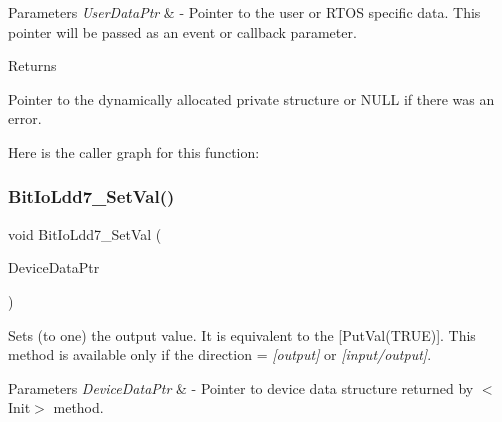 \begin{DoxyParams}{Parameters}
{\em User\+Data\+Ptr} & -\/ Pointer to the user or R\+T\+OS specific data. This pointer will be passed as an event or callback parameter. \\
\hline
\end{DoxyParams}
\begin{DoxyReturn}{Returns}

\begin{DoxyItemize}
\item Pointer to the dynamically allocated private structure or N\+U\+LL if there was an error. 
\end{DoxyItemize}
\end{DoxyReturn}
Here is the caller graph for this function\+:
\mbox{\label{group___bit_io_ldd7__module_gaae11392cdaf0061ec255e1de58e509f5}} 
\subsubsection{\texorpdfstring{Bit\+Io\+Ldd7\+\_\+\+Set\+Val()}{BitIoLdd7\_SetVal()}}
{\footnotesize\ttfamily void Bit\+Io\+Ldd7\+\_\+\+Set\+Val (\begin{DoxyParamCaption}\item[{\hyperlink{group___p_e___types__module_gac5cf1362f1f0e3a2ce71b1bf2276d091}{L\+D\+D\+\_\+\+T\+Device\+Data} $\ast$}]{Device\+Data\+Ptr }\end{DoxyParamCaption})}



Sets (to one) the output value. It is equivalent to the \mbox{[}Put\+Val(\+T\+R\+U\+E)\mbox{]}. This method is available only if the direction = {\itshape \mbox{[}output\mbox{]}} or {\itshape \mbox{[}input/output\mbox{]}}. 


\begin{DoxyParams}{Parameters}
{\em Device\+Data\+Ptr} & -\/ Pointer to device data structure returned by $<$\+Init$>$ method. \\
\hline
\end{DoxyParams}
